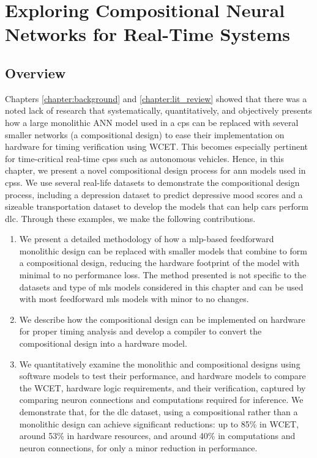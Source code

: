 \chapter{Exploring Compositional Neural Networks for Real-Time Systems} \label{chapter:compositional}
\glsresetall

\section{Overview}

Chapters \ref{chapter:background} and \ref{chapter:lit_review} showed that there was a noted lack of research that systematically, quantitatively, and objectively presents how a large monolithic ANN model used in a \gls{cps} can be replaced with several smaller networks (a compositional design) to ease their implementation on hardware for timing verification using WCET. This becomes especially pertinent for time-critical real-time \glspl{cps} such as autonomous vehicles. Hence, in this chapter, we present a novel compositional design process for \gls{ann} models used in \glspl{cps}. We use several real-life datasets to demonstrate the compositional design process, including a depression dataset to predict depressive mood scores and a sizeable transportation dataset to develop the models that can help cars perform \gls{dlc}. Through these examples, we make the following contributions. 

\begin{enumerate}
    \item We present a detailed methodology of how a \gls{mlp}-based feedforward monolithic design can be replaced with smaller models that combine to form a compositional design, reducing the hardware footprint of the model with minimal to no performance loss. The method presented is not specific to the datasets and type of \glspl{ml} models considered in this chapter and can be used with most feedforward \glspl{ml} models with minor to no changes.
    \item We describe how the compositional design can be implemented on hardware for proper timing analysis and develop a compiler to convert the compositional design into a hardware model.
    \item We quantitatively examine the monolithic and compositional designs using software models to test their performance, and hardware models to compare the WCET, hardware logic requirements, and their verification, captured by comparing neuron connections and computations required for inference. We demonstrate that, for the \gls{dlc} dataset, using a compositional rather than a monolithic design can achieve significant reductions: up to 85\% in WCET, around 53\% in hardware resources, and around 40\% in computations and neuron connections, for only a minor reduction in performance.
\end{enumerate}

